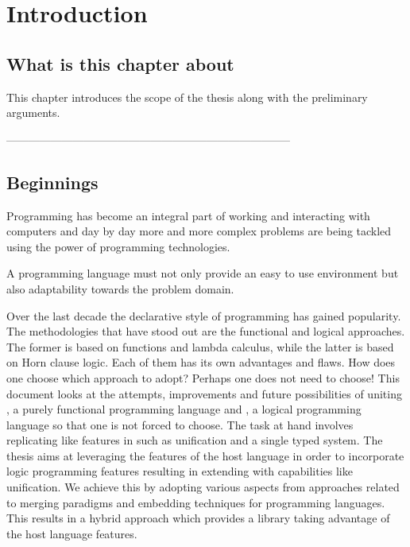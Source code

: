 \documentclass[thesis-solanki.tex]{subfiles}
\begin{document}
\chapter{Introduction}\label{chap:introduction}


\section{What is this chapter about}

This chapter introduces the scope of the thesis along with the preliminary arguments.


-----------------------------------------------------------------------------


\section{Beginnings}

Programming has become an integral part of working and interacting with computers and day by day more and more complex
problems are being tackled using the power of programming technologies.

A programming language must not only provide an easy to use environment but also adaptability towards the problem domain.

Over the last decade the declarative style of programming has gained popularity.
The methodologies that have stood out are the functional and logical approaches.
The former is based on functions and lambda calculus, while the latter is based on Horn clause logic.
Each of them has its own advantages and flaws.
How does one choose which approach to adopt?
Perhaps one does not need to choose!
This document looks at the attempts, improvements and future possibilities of uniting , a purely
functional programming language and , a logical programming language so that one is not forced to
choose.
The task at hand involves replicating  like features in  such as unification and
a single typed system.
The thesis aims at leveraging the features of the host language in order to incorporate logic programming features
resulting in extending  with capabilities like unification.
We achieve this by adopting various aspects from approaches related to merging paradigms and embedding techniques
for programming languages.
This results in a hybrid approach which provides a library taking advantage of the host language features.
\end{document}
